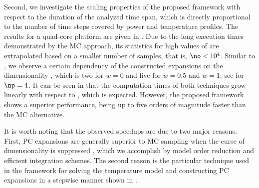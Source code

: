 Second, we investigate the scaling properties of the proposed framework with
respect to the duration of the analyzed time span, which is directly
proportional to the number of time steps \ns covered by power and temperature
profiles. The results for a quad-core platform are given in
. Due to the long execution times demonstrated
by the \ac{MC} approach, its statistics for high values of \ns are extrapolated
based on a smaller number of samples, that is, $\no < 10^4$. Similar to
, we observe a certain dependency of the
constructed expansions on the dimensionality \nz, which is two for $w = 0$ and
five for $w = 0.5$ and $w = 1$; see  for
$\np = 4$. It can be seen in  that the
computation times of both techniques grow linearly with respect to \ns, which is
expected. However, the proposed framework shows a superior performance, being up
to five orders of magnitude faster than the \ac{MC} alternative.

It is worth noting that the observed speedups are due to two major reasons.
First, \ac{PC} expansions are generally superior to \ac{MC} sampling when the
curse of dimensionality is suppressed \cite{eldred2008, xiu2010}, which we
accomplish by model order reduction and efficient integration schemes. The
second reason is the particular technique used in the framework for solving the
temperature model and constructing \ac{PC} expansions in a stepwise manner shown
in .
